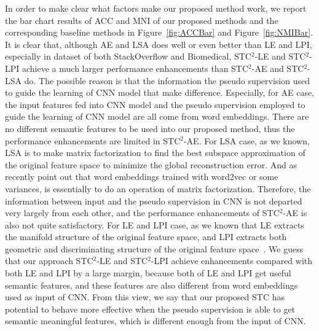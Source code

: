 \documentclass[review]{elsarticle}
\begin{document}
In order to make clear what factors make our proposed method work, we report the bar chart results of ACC and MNI of our proposed methods and the corresponding baseline methods in Figure~\ref{fig:ACCBar} and Figure~\ref{fig:NMIBar}. It is clear that, although AE and LSA does well or even better than LE and LPI, especially in dataset of both StackOverflow and Biomedical, STC$^2$-LE and STC$^2$-LPI achieve a much larger performance enhancements than STC$^2$-AE and STC$^2$-LSA do. The possible reason is that the information the pseudo supervision used to guide the learning of CNN model that make difference. Especially, for AE case, the input features fed into CNN model and the pseudo supervision employed to guide the learning of CNN model are all come from word embeddings. There are no different semantic features to be used into our proposed method, thus the performance enhancements are limited in STC$^2$-AE. For LSA case, as we known, LSA is to make matrix factorization to find the best subspace approximation of the original feature space to minimize the global reconstruction error. And as~\cite{26_pennington2014glove,li2015mfp} recently point out that word embeddings trained with word2vec or some variances, is essentially to do an operation of matrix factorization. Therefore, the information between input and the pseudo supervision in CNN is not departed very largely from each other, and the performance enhancements of STC$^2$-AE is also not quite satisfactory. For LE and LPI case, as we known that LE extracts the manifold structure of the original feature space, and LPI extracts both geometric and discriminating structure of the original feature space~\cite{4_cai2005document}. We guess that our approach STC$^2$-LE and STC$^2$-LPI achieve enhancements compared with both LE and LPI by a large margin, because both of LE and LPI get useful semantic features, and these features are also different from word embeddings used as input of CNN. From this view, we say that our proposed STC has potential to behave more effective when the pseudo supervision is able to get semantic meaningful features, which is different enough from the input of CNN.
\end{document}
